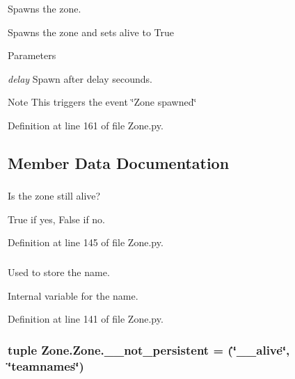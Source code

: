 Spawns the zone. 

Spawns the zone and sets alive to True 
\begin{DoxyParams}{Parameters}
\item[{\em delay}]Spawn after delay secounds. \end{DoxyParams}
\begin{DoxyNote}{Note}
This triggers the event \char`\"{}Zone spawned\char`\"{} 
\end{DoxyNote}


Definition at line 161 of file Zone.py.



\subsection{Member Data Documentation}
\hypertarget{class_zone_1_1_zone_a1c4e31d1327ad4d7a2c31a2b7fcde5e7}{
\subsubsection[{\_\-\_\-alive}]{}}
\label{class_zone_1_1_zone_a1c4e31d1327ad4d7a2c31a2b7fcde5e7}


Is the zone still alive? 

True if yes, False if no. 

Definition at line 145 of file Zone.py.

\hypertarget{class_zone_1_1_zone_a72ab1886c15120f42281d35955ab21b5}{
\subsubsection[{\_\-\_\-name}]{}}
\label{class_zone_1_1_zone_a72ab1886c15120f42281d35955ab21b5}


Used to store the name. 

Internal variable for the name. 

Definition at line 141 of file Zone.py.

\hypertarget{class_zone_1_1_zone_a3e925f38205ecb6e4c2bab8c79182573}{
\subsubsection[{\_\-\_\-not\_\-persistent}]{\setlength{\rightskip}{0pt plus 5cm}tuple {\bf Zone.Zone.\_\-\_\-not\_\-persistent} = (\char`\"{}\_\-\_\-alive\char`\"{}, \char`\"{}{\bf teamnames}\char`\"{})}}
\label{class_zone_1_1_zone_a3e925f38205ecb6e4c2bab8c79182573}


